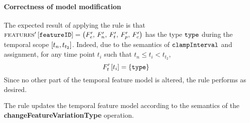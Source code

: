 \paragraph{Correctness of model modification}
The expected result of applying the rule is that $\textsc{features}' \left[ \texttt{featureID} \right] = \left(F'_e,\, F'_n,\, F'_t,\, F'_p,\, F'_c\right)$ has the type $\texttt{type}$ during the temporal scope $\interval{t_n}{t_{t_2}}$. Indeed, due to the semantics of $\texttt{clampInterval}$ and assignment, for any time point $t_i$ such that $t_n \leq t_i < t_{t_2}$,
\[
   F'_t \left[ t_i \right] = \left\{\texttt{type}\right\}
\]
Since no other part of the temporal feature model is altered, the rule performs as desired.
\\

\begin{lemma}
   The  rule updates the temporal feature model according to the semantics of the \textbf{changeFeatureVariationType} operation.
   \label{lemma:change-feature-variation-type-mod}
\end{lemma}
